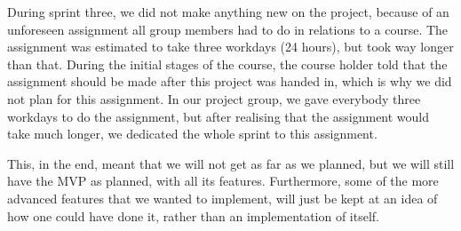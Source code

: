 During sprint three, we did not make anything new on the project, because of an unforeseen assignment all group members had to do in relations to a course.
The assignment was estimated to take three workdays (24 hours), but took way longer than that.
During the initial stages of the course, the course holder told that the assignment should be made after this project was handed in, which is why we did not plan for this assignment.
In our project group, we gave everybody three workdays to do the assignment, but after realising that the assignment would take much longer, we dedicated the whole sprint to this assignment.

This, in the end, meant that we will not get as far as we planned, but we will still have the MVP as planned, with all its features.
Furthermore, some of the more advanced features that we wanted to implement, will just be kept at an idea of how one could have done it, rather than an implementation of itself.
